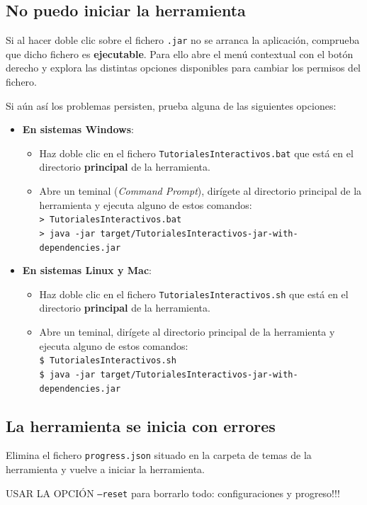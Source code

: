 \documentclass[]{article}
\begin{document}
\subsection{No puedo iniciar la herramienta}\label{sec:problemas_arrancar}
Si al hacer doble clic sobre el fichero \texttt{.jar} no se arranca la aplicación, comprueba que dicho fichero es \textbf{ejecutable}. Para ello abre el menú contextual con el botón derecho y explora las distintas opciones disponibles para cambiar los permisos del fichero.

Si aún así los problemas persisten, prueba alguna de las siguientes opciones:
\begin{itemize}
	\item \textbf{En sistemas Windows}: 
	\begin{itemize}
	\item Haz doble clic en el fichero \texttt{TutorialesInteractivos.bat} que está en el directorio \textbf{principal} de la herramienta. 
	\item Abre un teminal (\emph{Command Prompt}), dirígete al directorio principal de la herramienta y ejecuta alguno de estos comandos:
	\\
	{\small \texttt{>\ TutorialesInteractivos.bat}}\\
	{\small \texttt{>\ java -jar target/TutorialesInteractivos-jar-with-dependencies.jar}}\\
	\end{itemize}
	\item \textbf{En sistemas Linux y Mac}:
	\begin{itemize}
		\item Haz doble clic en el fichero \texttt{TutorialesInteractivos.sh} que está en el directorio \textbf{principal} de la herramienta. 
		\item Abre un teminal, dirígete al directorio principal de la herramienta y ejecuta alguno de estos comandos:
		\\
		{\small \texttt{\$ TutorialesInteractivos.sh}}\\
		{\small \texttt{\$ java -jar target/TutorialesInteractivos-jar-with-dependencies.jar}}\\
	\end{itemize}
\end{itemize}	
	


\subsection{La herramienta se inicia con errores}
Elimina el fichero \texttt{progress.json} situado en la carpeta de temas de la herramienta y vuelve a iniciar la herramienta.

USAR LA OPCIÓN 	\texttt{--reset} para borrarlo todo: configuraciones y progreso!!!
\end{document}

